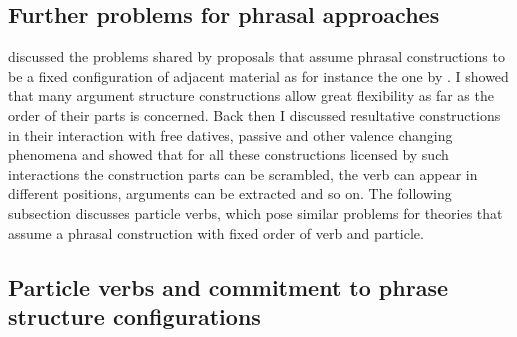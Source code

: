 \begin{exe}
\begin{xlist}[iv.]
\begin{exe}
\begin{xlist}[iv.]
\section{Further problems for phrasal approaches}

\citet{Mueller2006d} discussed the problems shared by proposals that assume phrasal constructions to
be a fixed configuration of adjacent material as for instance the one by \citet{GJ2004a}. I showed that many
argument structure constructions allow great flexibility as far as the order of their parts is
concerned. Back then I discussed resultative constructions in their interaction with free datives,
passive and other valence changing phenomena and showed that for all these constructions licensed by such interactions the construction parts can be scrambled, the verb can appear in different positions,
arguments can be extracted and so on. The following subsection discusses particle verbs, which pose
similar problems for theories that assume a phrasal construction with fixed order of verb and particle.

\subsection{Particle verbs and commitment to phrase structure configurations}
\label{sec-particle-verbs-phrasal}


\end{xlist}
\end{exe}
\end{xlist}
\end{exe}
